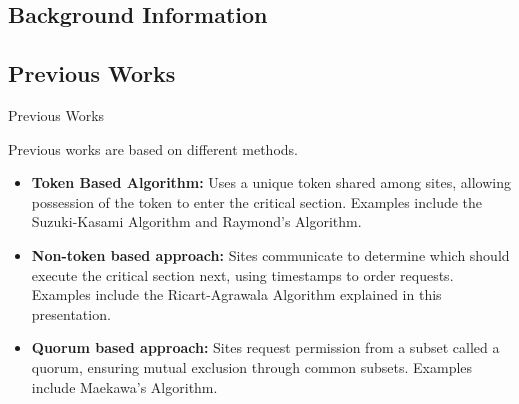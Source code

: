\documentclass[11pt]{beamer}              %
\begin{document}
\subsection{Background Information}


\subsection{Previous Works}
\begin{frame}{Previous Works}

Previous works are based on different methods.

\begin{itemize}
    \item \textbf{Token Based Algorithm:} Uses a unique token shared among sites, allowing possession of the token to enter the critical section. Examples include the Suzuki-Kasami Algorithm and Raymond’s Algorithm.
    \item \textbf{Non-token based approach:} Sites communicate to determine which should execute the critical section next, using timestamps to order requests. Examples include the Ricart-Agrawala Algorithm explained in this presentation.
    \item \textbf{Quorum based approach:} Sites request permission from a subset called a quorum, ensuring mutual exclusion through common subsets. Examples include Maekawa’s Algorithm.
\end{itemize}

\end{frame}
\end{document}
